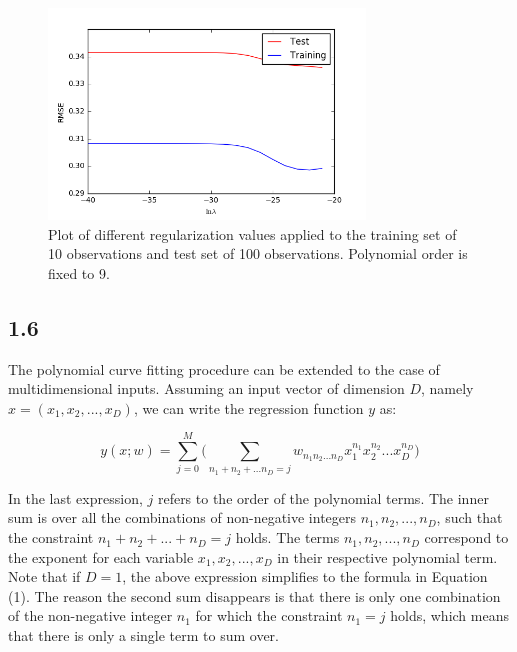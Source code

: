 \documentclass[a4paper]{article}
\begin{document}
\begin{figure}[h!]
\begin{center}
\includegraphics[width=0.75\textwidth]{Images/train_vs_test_reg.png}
\caption{Plot of different regularization values applied to the training set of 10 observations and test set of 100 observations. Polynomial order is fixed to 9.}
\label{fig:rtrain_vs_test_reg}
\end{center}
\end{figure}


\subsection*{1.6}

The polynomial curve fitting procedure can be extended to the case of multidimensional inputs. Assuming an input vector of dimension $D$, namely $x = (x_1,x_2,...,x_D)$, we can write the regression function $y$ as:

\begin{equation}
	y(x;w) = \sum_{j=0}^M \Bigg( \sum_{n_1+n_2+...n_D=j} w_{n_1 n_2...n_D}x_1^{n_1}x_2^{n_2} ... x_D^{n_D}\Bigg)
\end{equation}

In the last expression, $j$ refers to the order of the polynomial terms. The inner sum is over all the combinations of non-negative integers $n_1, n_2, ..., n_D$, such that the constraint $n_1+ n_2 + ... + n_D = j$ holds. The terms $n_1, n_2,..., n_D$ correspond to the exponent for each variable $x_1,x_2,...,x_D$ in their respective polynomial term.\\

Note that if $D = 1$, the above expression simplifies to the formula in Equation (1). The reason the second sum disappears is that there is only one combination of the non-negative integer $n_1$ for which the constraint $n_1 = j$ holds, which means that there is only a single term to sum over.\\
\end{document}
